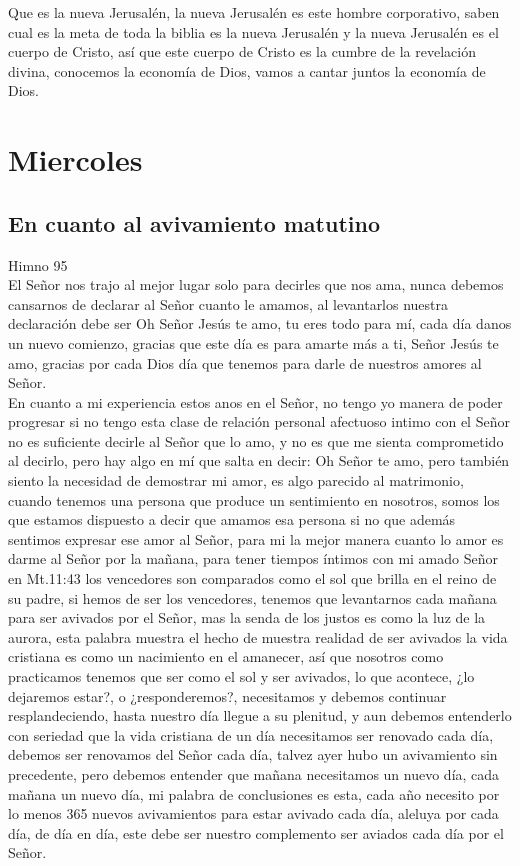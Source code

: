 \documentclass[12pt]{article}
\begin{document}
Que es la nueva Jerusalén, la nueva Jerusalén es este hombre corporativo, saben cual es la meta de toda la biblia es la nueva Jerusalén y la nueva Jerusalén es el cuerpo de Cristo, así que este cuerpo de Cristo es la cumbre de la revelación divina, conocemos la economía de Dios, vamos a cantar juntos la economía de Dios.\\

\section*{Miercoles}

\subsection*{En cuanto al avivamiento matutino}

Himno 95\\

El Señor nos trajo al mejor lugar solo para decirles que nos ama, nunca debemos cansarnos de declarar al Señor cuanto le amamos, al levantarlos nuestra declaración debe ser Oh Señor Jesús te amo, tu eres todo para mí, cada día danos un nuevo comienzo, gracias que este día es para amarte más a ti, Señor Jesús te amo, gracias por cada Dios día que tenemos para darle de nuestros amores al Señor.\\

En cuanto a mi experiencia estos anos en el Señor, no tengo yo manera de poder progresar si no tengo esta clase de relación personal afectuoso  intimo con el Señor no es suficiente decirle al Señor que lo amo, y no es que me sienta comprometido al decirlo, pero hay algo en mí que salta en decir: Oh Señor te amo, pero también siento la necesidad de demostrar mi amor, es algo parecido al matrimonio, cuando tenemos una persona que produce un sentimiento en nosotros, somos los que estamos dispuesto a decir que amamos esa persona si no que además sentimos expresar ese amor al Señor, para mi la mejor manera cuanto lo amor es darme al Señor por la mañana, para tener tiempos íntimos con mi amado Señor en Mt.11:43 los vencedores son comparados como el sol que brilla en el reino de su padre, si hemos de ser los vencedores, tenemos que levantarnos cada mañana para ser avivados por el Señor, mas la senda de los justos es como la luz de la aurora, esta palabra muestra el hecho de muestra realidad de ser avivados la vida cristiana es como un nacimiento en el amanecer, así que nosotros como practicamos tenemos que ser como el sol y ser avivados, lo que acontece, ¿lo dejaremos estar?, o ¿responderemos?, necesitamos y debemos continuar resplandeciendo, hasta nuestro día llegue a su plenitud, y aun debemos entenderlo con seriedad que la vida cristiana de un día necesitamos ser renovado cada día, debemos ser renovamos del Señor cada día, talvez ayer hubo un avivamiento sin precedente, pero debemos entender que mañana necesitamos un nuevo día, cada mañana un nuevo día, mi palabra de conclusiones es esta, cada año necesito por lo menos 365 nuevos avivamientos para estar avivado cada día, aleluya por cada día, de día en día, este debe ser nuestro complemento ser aviados cada día por el Señor.\\
\end{document}
